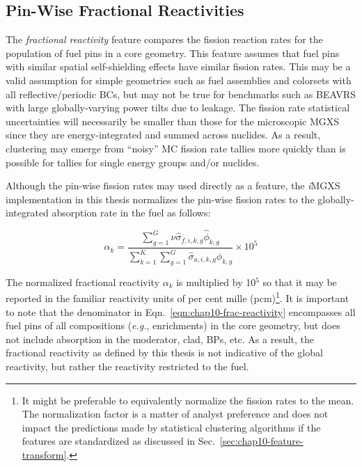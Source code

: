 \clearpage

\subsection{Pin-Wise Fractional Reactivities}
\label{subsec:chap10-frac-reactivity}

The \textit{fractional reactivity} feature compares the fission reaction rates for the population of fuel pins in a core geometry. This feature assumes that fuel pins with similar spatial self-shielding effects have similar fission rates. This may be a valid assumption for simple geometries such as fuel assemblies and colorsets with all reflective/periodic \acp{BC}, but may not be true for benchmarks such as \ac{BEAVRS} with large globally-varying power tilts due to leakage. The fission rate statistical uncertainties will necessarily be smaller than those for the microscopic \ac{MGXS} since they are energy-integrated and summed across nuclides. As a result, clustering may emerge from ``noisy'' \ac{MC} fission rate tallies more quickly than is possible for tallies for single energy groups and/or nuclides.

Although the pin-wise fission rates may used directly as a feature, the \textit{i}\ac{MGXS} implementation in this thesis normalizes the pin-wise fission rates to the globally-integrated absorption rate in the fuel as follows:

\begin{equation}
\label{eqn:chap10-frac-reactivity}
\alpha_{k} = \frac{\displaystyle\sum\limits_{g=1}^{G}\nu\hat{\sigma}_{f,i,k,g}\hat{\phi}_{k,g}}{\displaystyle\sum\limits_{k=1}^{K}\displaystyle\sum\limits_{g=1}^{G}\hat{\sigma}_{a,i,k,g}\hat{\phi}_{k,g}} \times 10^{5}
\end{equation}

\noindent The normalized fractional reactivity $\alpha_{k}$  is multiplied by 10$^{5}$ so that it may be reported in the familiar reactivity units of per cent mille (pcm)\footnote{It might be preferable to equivalently normalize the fission rates to the mean. The normalization factor is a matter of analyst preference and does not impact the predictions made by statistical clustering algorithms if the features are standardized as discussed in Sec.~\ref{sec:chap10-feature-transform}.}. It is important to note that the denominator in Eqn.~\ref{eqn:chap10-frac-reactivity} encompasses all fuel pins of all compositions (\textit{e.g.}, enrichments) in the core geometry, but does not include absorption in the moderator, clad, \acp{BP}, etc. As a result, the fractional reactivity as defined by this thesis is not indicative of the global reactivity, but rather the reactivity restricted to the fuel.

